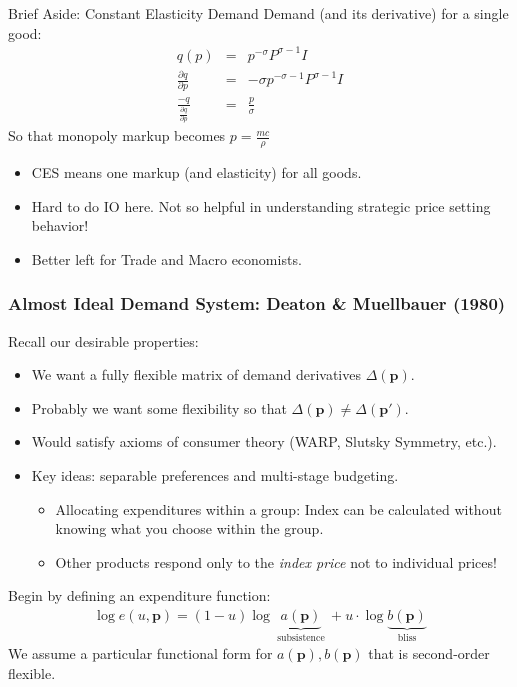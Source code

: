 \documentclass[xcolor=pdftex,dvipsnames,table,mathserif,aspectratio=169]{beamer}
\begin{document}
\begin{frame}{Brief Aside: Constant Elasticity Demand}
Demand (and its derivative) for a single good:
\begin{eqnarray*}
q(p) &=& p^{-\sigma} P^{\sigma-1} I \\
\frac{\partial q}{\partial p} &=& -\sigma p^{-\sigma-1} P^{\sigma-1} I\\
\frac{-q}{\frac{\partial q}{\partial p} } &=& \frac{p}{\sigma}
\end{eqnarray*}
So that monopoly markup becomes $ p = \frac{ mc}{\rho}$
\begin{itemize}
\item CES means one markup (and elasticity) for all goods.
\item Hard to do IO here. Not so helpful in understanding strategic price setting behavior!
\item Better left for Trade and Macro economists.
\end{itemize}
\end{frame}



\begin{frame}
\frametitle{Almost Ideal Demand System: Deaton \& Muellbauer (1980)}
Recall our desirable properties:
\begin{itemize}
\item We want a fully flexible matrix of demand derivatives $\Delta(\mathbf{p})$.
\item Probably we want some flexibility so that $\Delta(\mathbf{p}) \neq \Delta(\mathbf{p'})$.
\item Would satisfy axioms of consumer theory (WARP, Slutsky Symmetry, etc.).
\item Key ideas: \alert{separable preferences} and \alert{multi-stage budgeting}.
\begin{itemize}
\item Allocating expenditures within a group: Index can be calculated without knowing what you choose within the group.
\item Other products respond only to the \textit{index price} not to individual prices!
\end{itemize}
\end{itemize}
Begin by defining an expenditure function:
\begin{eqnarray*}
\log e(u,\mathbf{p}) = (1- u) \log \underbrace{a(\mathbf{p})}_{\text{ subsistence }} + u \cdot \log \underbrace{b(\mathbf{p})}_{\text{ bliss }}
\end{eqnarray*}
We assume a particular functional form for $a(\mathbf{p}),b(\mathbf{p})$ that is second-order flexible.
\end{frame}
\end{document}
